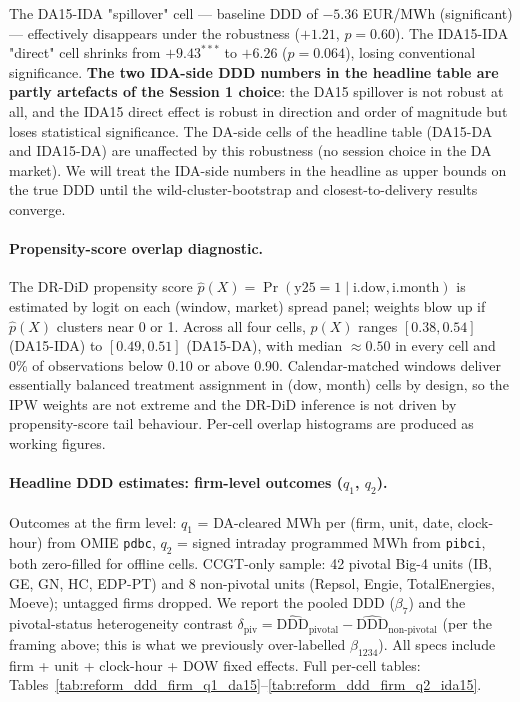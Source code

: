 \documentclass[11pt,a4paper]{article}
\newcommand{\code}[1]{\nolinkurl{#1}}
\begin{document}
The DA15-IDA "spillover" cell --- baseline DDD of $-5.36$ EUR/MWh (significant) --- effectively disappears under the robustness ($+1.21$, $p=0.60$). The IDA15-IDA "direct" cell shrinks from $+9.43^{***}$ to $+6.26$ ($p=0.064$), losing conventional significance. \textbf{The two IDA-side DDD numbers in the headline table are partly artefacts of the Session 1 choice}: the DA15 spillover is not robust at all, and the IDA15 direct effect is robust in direction and order of magnitude but loses statistical significance. The DA-side cells of the headline table (DA15-DA and IDA15-DA) are unaffected by this robustness (no session choice in the DA market). We will treat the IDA-side numbers in the headline as upper bounds on the true DDD until the wild-cluster-bootstrap and closest-to-delivery results converge.

\paragraph{Propensity-score overlap diagnostic.}
The DR-DiD propensity score $\hat p(X) = \Pr(\text{y25} = 1 \mid \text{i.dow}, \text{i.month})$ is estimated by logit on each (window, market) spread panel; weights blow up if $\hat p(X)$ clusters near 0 or 1. Across all four cells, $\hat p(X)$ ranges $[0.38, 0.54]$ (DA15-IDA) to $[0.49, 0.51]$ (DA15-DA), with median $\approx 0.50$ in every cell and 0\% of observations below 0.10 or above 0.90. Calendar-matched windows deliver essentially balanced treatment assignment in (dow, month) cells by design, so the IPW weights are not extreme and the DR-DiD inference is not driven by propensity-score tail behaviour. Per-cell overlap histograms are produced as working figures.

\paragraph{Headline DDD estimates: firm-level outcomes ($q_1$, $q_2$).}
Outcomes at the firm level: $q_1$ = DA-cleared MWh per (firm, unit, date, clock-hour) from OMIE \code{pdbc}, $q_2$ = signed intraday programmed MWh from \code{pibci}, both zero-filled for offline cells. CCGT-only sample: 42 pivotal Big-4 units (IB, GE, GN, HC, EDP-PT) and 8 non-pivotal units (Repsol, Engie, TotalEnergies, Moeve); untagged firms dropped. We report the pooled DDD ($\beta_7$) and the pivotal-status heterogeneity contrast $\delta_{\text{piv}} = \widehat{\text{DDD}}_{\text{pivotal}} - \widehat{\text{DDD}}_{\text{non-pivotal}}$ (per the framing above; this is what we previously over-labelled $\beta_{1234}$). All specs include firm + unit + clock-hour + DOW fixed effects. Full per-cell tables: Tables~\ref{tab:reform_ddd_firm_q1_da15}--\ref{tab:reform_ddd_firm_q2_ida15}.
\end{document}
